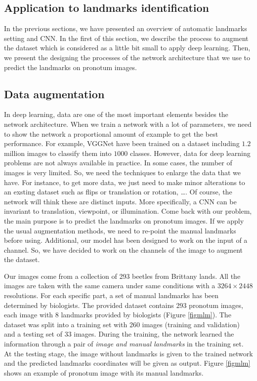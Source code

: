 \documentclass{article} %
\begin{document}
\begin{multicols}{2}
\section{Application to landmarks identification}
\label{SecApp}
In the previous sections, we have presented an overview of automatic landmarks setting and CNN. In the first of this section, we describe the process to augment the dataset which is considered as a little bit small to apply deep learning. Then, we present the designing the processes of the network architecture that we use to predict the landmarks on pronotum images.

\subsection{Data augmentation}
\label{Secdataaug}
In deep learning, data are one of the most important elements besides the network architecture. When we train a network with a lot of parameters, we need to show the network a proportional amount of example to get the best performance. For example, VGGNet \cite{.} have been trained on a dataset including $1.2$ million images to classify them into $1000$ classes. However, data for deep learning problems are not always available in practice. In some cases, the number of images is very limited. So,
we need the techniques to enlarge the data that we have. For instance, to get more data, we just need to make minor alterations to an exsting dataset such as flips or translation or rotation, \ldots. Of course, the network will think these are distinct inputs. More specifically, a CNN can be invariant to translation, viewpoint, or illumination. Come back with our problem, the main purpose is to predict the landmarks on pronotum images. If we apply the usual augmentation methods, we need to re-point the manual landmarks before using. Additional, our model has been designed to work on the input of a channel. So, we have decided to work on the channels of the image to augment the dataset.

Our images come from a collection of 293 beetles from Brittany lands. All the images are taken with the same camera under same conditions with a $3264 \times 2448$ resolutions. For each specific part, a set of manual landmarks has been determined by biologists. The provided dataset contains 293 pronotum images, each image with 8 landmarks provided by biologists (Figure \ref{figmlm}). The dataset was split into a training set with 260 images (training and validation) and a testing set of 33 images. During the training, the network learned the information through a pair of \textit{image and manual landmarks} in the training set. At the testing stage, the image without landmarks is given to the trained network and the predicted landmarks coordinates will be given as output. Figure \ref{figmlm} shows an example of pronotum image with its manual landmarks.


\end{multicols}
\end{document}
